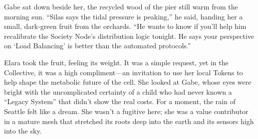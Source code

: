 Gabe sat down beside her, the recycled wood of the pier still warm from the morning sun. ``Silas says the tidal pressure is peaking,'' he said, handing her a small, dark-green fruit from the orchards. ``He wants to know if you'll help him recalibrate the Society Node's distribution logic tonight. He says your perspective on `Load Balancing' is better than the automated protocols.''

Elara took the fruit, feeling its weight. It was a simple request, yet in the Collective, it was a high compliment—an invitation to use her local Tokens to help shape the metabolic future of the cell. She looked at Gabe, whose eyes were bright with the uncomplicated certainty of a child who had never known a ``Legacy System'' that didn't show the real costs. For a moment, the rain of Seattle felt like a dream. She wasn't a fugitive here; she was a value contributor in a mature mesh that stretched its roots deep into the earth and its sensors high into the sky.
